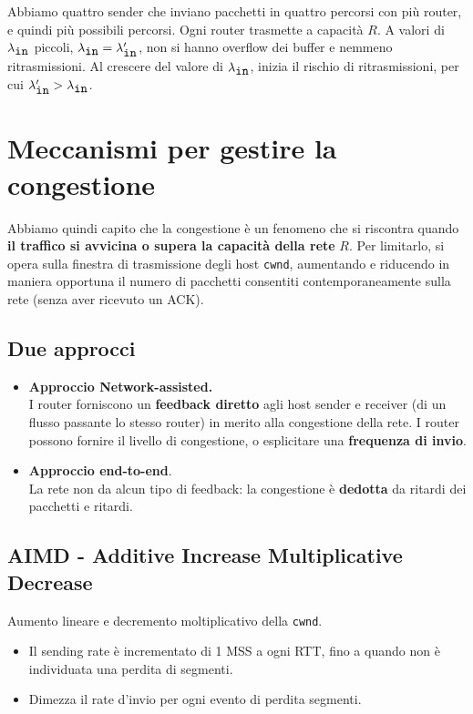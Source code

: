 Abbiamo quattro sender che inviano pacchetti in quattro percorsi con più router, e quindi più possibili percorsi. Ogni router trasmette a capacità $R$. A valori di $\lambda_{\verb|in|}$ piccoli, $\lambda_{\verb|in|} = \lambda_{\verb|in|}'$, non si hanno overflow dei buffer e nemmeno ritrasmissioni. Al crescere del valore di $\lambda_{\verb|in|}$, inizia il rischio di ritrasmissioni, per cui $\lambda_{\verb|in|}' > \lambda_{\verb|in|}$.

\newpage

\section{Meccanismi per gestire la congestione}
Abbiamo quindi capito che la congestione è un fenomeno che si riscontra quando \textbf{il traffico si avvicina o supera la capacità della rete} $R$. Per limitarlo, si opera sulla finestra di trasmissione degli host \verb|cwnd|, aumentando e riducendo in maniera opportuna il numero di pacchetti consentiti contemporaneamente sulla rete (senza aver ricevuto un ACK).
\subsection{Due approcci}
\begin{itemize}
	\item \textbf{Approccio Network-assisted.}\\
	I router forniscono un \textbf{feedback diretto} agli host sender e receiver (di un flusso passante lo stesso router) in merito alla congestione della rete. I router possono fornire il livello di congestione, o esplicitare una \textbf{frequenza di invio}.
	
	\item \textbf{Approccio end-to-end}.\\
	La rete non da alcun tipo di feedback: la congestione è \textbf{dedotta} da ritardi dei pacchetti e ritardi.
\end{itemize}

\subsection{AIMD - Additive Increase Multiplicative Decrease}
Aumento lineare e decremento moltiplicativo della \verb|cwnd|.
\begin{itemize}
	\item Il sending rate è incrementato di 1 MSS a ogni RTT, fino a quando non è individuata una perdita di segmenti.
	\item Dimezza il rate d'invio per ogni evento di perdita segmenti.
\end{itemize}

